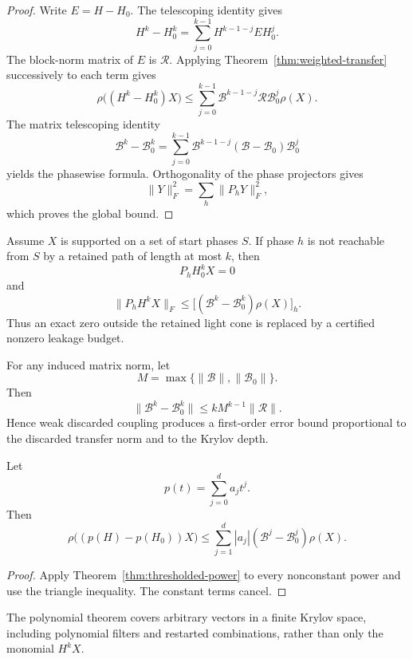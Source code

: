 \begin{proof}
Write $E=H-H_0$.  The telescoping identity gives
\[
H^k-H_0^k
=
\sum_{j=0}^{k-1}H^{k-1-j}EH_0^j.
\]
The block-norm matrix of $E$ is $\mathcal R$.  Applying
Theorem~\ref{thm:weighted-transfer} successively to each term gives
\[
\rho\bigl((H^k-H_0^k)X\bigr)
\leq
\sum_{j=0}^{k-1}
\mathcal B^{k-1-j}\mathcal R\mathcal B_0^j\rho(X).
\]
The matrix telescoping identity
\[
\mathcal B^k-\mathcal B_0^k
=
\sum_{j=0}^{k-1}
\mathcal B^{k-1-j}(\mathcal B-\mathcal B_0)\mathcal B_0^j
\]
yields the phasewise formula.  Orthogonality of the phase projectors gives
\[
\lVert Y\rVert_F^2=\sum_h\lVert P_hY\rVert_F^2,
\]
which proves the global bound.
\end{proof}

\begin{corollary}
\label{cor:approx-lightcone}
Assume $X$ is supported on a set of start phases $S$.  If phase $h$ is not
reachable from $S$ by a retained path of length at most $k$, then
\[
P_hH_0^kX=0
\]
and
\[
\boxed{
\lVert P_hH^kX\rVert_F
\leq
\bigl[(\mathcal B^k-\mathcal B_0^k)\rho(X)\bigr]_h.
}
\]
Thus an exact zero outside the retained light cone is replaced by a certified
nonzero leakage budget.
\end{corollary}

\begin{corollary}
For any induced matrix norm, let
\[
M=\max\{\lVert\mathcal B\rVert,\lVert\mathcal B_0\rVert\}.
\]
Then
\[
\boxed{
\lVert\mathcal B^k-\mathcal B_0^k\rVert
\leq
kM^{k-1}\lVert\mathcal R\rVert.
}
\]
Hence weak discarded coupling produces a first-order error bound proportional
to the discarded transfer norm and to the Krylov depth.
\end{corollary}

\begin{theorem}
\label{thm:polynomial-certificate}
Let
\[
p(t)=\sum_{j=0}^d a_jt^j.
\]
Then
\[
\boxed{
\rho\bigl((p(H)-p(H_0))X\bigr)
\leq
\sum_{j=1}^d
|a_j|(\mathcal B^j-\mathcal B_0^j)\rho(X).
}
\]
\end{theorem}

\begin{proof}
Apply Theorem~\ref{thm:thresholded-power} to every nonconstant power and use
the triangle inequality.  The constant terms cancel.
\end{proof}

The polynomial theorem covers arbitrary vectors in a finite Krylov space,
including polynomial filters and restarted combinations, rather than only the
monomial $H^kX$.

